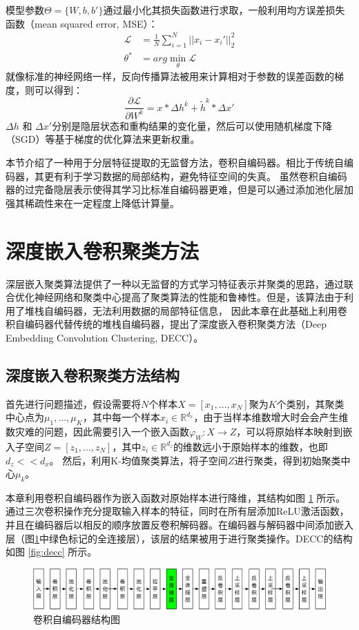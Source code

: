 模型参数$\Theta=\{{W},{b},{b'}\}$通过最小化其损失函数进行求取，一般利用均方误差损失函数（mean squared error, MSE）：
\begin{align}
	\mathscr{L} &= \frac{1}{N}\sum_{i=1}^N||x_i-x_i'||_2^2 \label{equ:mse_loss}\\
	\theta^* &= arg\min\limits_{\theta} \mathscr{L}  \label{equ:mse}
\end{align}
就像标准的神经网络一样，反向传播算法被用来计算相对于参数的误差函数的梯度，则可以得到：
\begin{equation}
	\frac{\partial \mathscr{L}}{\partial W^k}=x * \Delta h ^k+\tilde{h}^k * \Delta x'
\end{equation}
$\Delta h$ 和 $\Delta x'$分别是隐层状态和重构结果的变化量，然后可以使用随机梯度下降（SGD）等基于梯度的优化算法来更新权重。

本节介绍了一种用于分层特征提取的无监督方法，卷积自编码器。相比于传统自编码器，其更有利于学习数据的局部结构，避免特征空间的失真。
虽然卷积自编码器的过完备隐层表示使得其学习比标准自编码器更难，但是可以通过添加池化层加强其稀疏性来在一定程度上降低计算量。

\section{深度嵌入卷积聚类方法}
\label{sec:decc_method}
深层嵌入聚类算法提供了一种以无监督的方式学习特征表示并聚类的思路，通过联合优化神经网络和聚类中心提高了聚类算法的性能和鲁棒性。但是，该算法由于利用了堆栈自编码器，无法利用数据的局部特征信息，
因此本章在此基础上利用卷积自编码器代替传统的堆栈自编码器，提出了深度嵌入卷积聚类方法（Deep Embedding Convolution Clustering, DECC）。

\subsection{深度嵌入卷积聚类方法结构}
首先进行问题描述，假设需要将$N$个样本$X=[x_1,\dots,x_N]$聚为$K$个类别，其聚类中心点为$\mu_1,\dots,\mu_K$，其中每一个样本$x_i\in \mathbb{R}^{d_x}$，由于当样本维数增大时会会产生维数灾难的问题，因此需要引入一个嵌入函数$\varphi_W: X \rightarrow Z$，可以将原始样本映射到嵌入子空间$Z=[z_1,\dots,z_N]$，其中$z_i\in \mathbb{R}^{d_z}$的维数远小于原始样本的维数，也即$d_z<<d_x$。
然后，利用K-均值聚类算法，将子空间$Z$进行聚类，得到初始聚类中心${\mu_k}$。

本章利用卷积自编码器作为嵌入函数对原始样本进行降维，其结构如图 \ref{fig:cae} 所示。
通过三次卷积操作充分提取输入样本的特征，同时在所有层添加ReLU激活函数，并且在编码器后以相反的顺序放置反卷积解码器。在编码器与解码器中间添加嵌入层（图\ref{fig:cae}中绿色标记的全连接层），该层的结果被用于进行聚类操作。DECC的结构如图 \ref{fig:decc} 所示。
\begin{figure}[hbt]
	\centering
	\includegraphics[width=13.5cm]{figures/AE/cae}
	\caption{卷积自编码器结构图}
	\label{fig:cae}
\end{figure}

